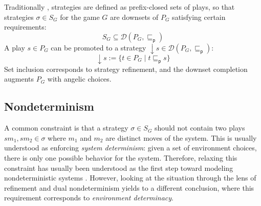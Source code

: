 \documentclass[draft,11pt]{report}
\newcommand{\kw}[1]{\ensuremath{ \mathsf{#1} }}
\newcommand{\pref}{\sqsubseteq_\kw{p}}  %
\begin{document}
Traditionally \citep{gamesem99},
strategies are defined as
prefix-closed sets of plays,
so that strategies $\sigma \in S_G$
for the game $G$ are downsets of $P_G$
satisfying certain requirements:
\[
    S_G \subseteq
    \mathcal{D}(P_G, {\pref})
\]
A play $s \in P_G$ can be promoted to a strategy
${\downarrow} s \in \mathcal{D}(P_G, {\pref})$:
\[
    {\downarrow} s := \{ t \in P_G \mid t \pref s \}
\]
Set inclusion corresponds to strategy refinement, %
and the downset completion augments $P_G$ with
angelic choices.


\subsection{Nondeterminism} %

A common constraint is that a strategy $\sigma \in S_G$
should not contain two plays $s m_1, s m_2 \in \sigma$
where $m_1$ and $m_2$ are distinct moves of the system.
This is usually understood as
enforcing \emph{system determinism}:
given a set of environment choices,
there is only one possible behavior for the system.
Therefore,
relaxing this constraint has usually been understood
as the first step toward modeling nondeterministic systems
\citep{gsfnd}.
However,
looking at the situation through the lens of
refinement and dual nondeterminism
yields to a different conclusion,
where this requirement corresponds to
\emph{environment determinacy}.

\end{document}
